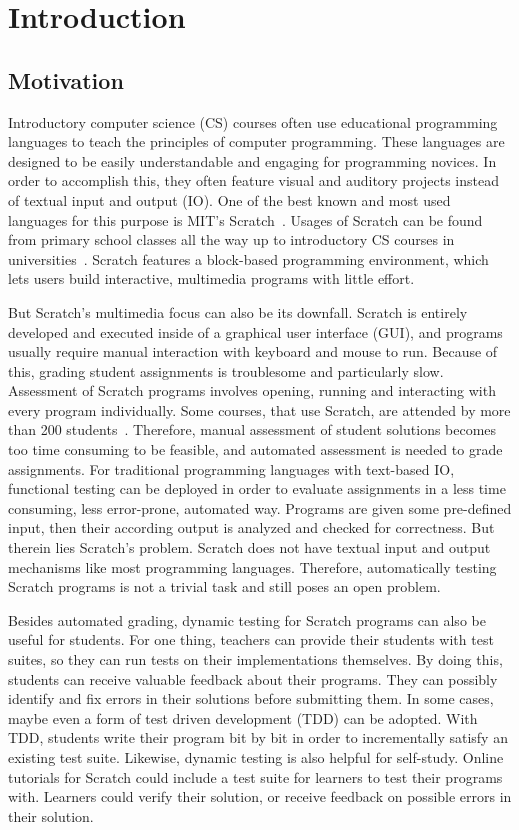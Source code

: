 \chapter{Introduction}

\section{Motivation}

Introductory computer science (CS) courses often use educational programming languages to teach the principles of computer programming.
These languages are designed to be easily understandable and engaging for programming novices.
In order to accomplish this, they often feature visual and auditory projects instead of textual input and output (IO).
One of the best known and most used languages for this purpose is MIT's Scratch~\cite{scratch, scratchproject}.
Usages of Scratch can be found from primary school classes all the way up to introductory CS courses in universities~\cite{itch}.
Scratch features a block-based programming environment, which lets users build interactive, multimedia programs with little effort.
\parspace

But Scratch's multimedia focus can also be its downfall.
Scratch is entirely developed and executed inside of a graphical user interface (GUI), and programs usually require manual interaction with keyboard and mouse to run.
Because of this, grading student assignments is troublesome and particularly slow.
Assessment of Scratch programs involves opening, running and interacting with every program individually.
Some courses, that use Scratch, are attended by more than 200 students~\cite{itch}.
Therefore, manual assessment of student solutions becomes too time consuming to be feasible, and automated assessment is needed to grade assignments.
For traditional programming languages with text-based IO, functional testing can be deployed in order to evaluate assignments in a less time consuming, less error-prone, automated way.
Programs are given some pre-defined input, then their according output is analyzed and checked for correctness.
But therein lies Scratch's problem.
Scratch does not have textual input and output mechanisms like most programming languages.
Therefore, automatically testing Scratch programs is not a trivial task and still poses an open problem.
\parspace

Besides automated grading, dynamic testing for Scratch programs can also be useful for students.
For one thing, teachers can provide their students with test suites, so they can run tests on their implementations themselves.
By doing this, students can receive valuable feedback about their programs.
They can possibly identify and fix errors in their solutions before submitting them.
In some cases, maybe even a form of test driven development (TDD) can be adopted.
With TDD, students write their program bit by bit in order to incrementally satisfy an existing test suite.
Likewise, dynamic testing is also helpful for self-study.
Online tutorials for Scratch could include a test suite for learners to test their programs with.
Learners could verify their solution, or receive feedback on possible errors in their solution.

